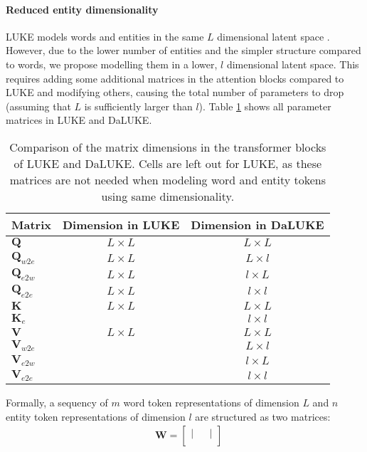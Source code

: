 \documentclass[10pt, a4paper]{article}
\begin{document}
{\paragraph{Reduced entity dimensionality}
LUKE models words and entities in the same $ L $ dimensional latent space \cite{yamada2020luke}.
However, due to the lower number of entities and the simpler structure compared to words, we propose modelling them in a lower, $ l $ dimensional latent space.
This requires adding some additional matrices in the attention blocks compared to LUKE and modifying others, causing the total number of parameters to drop (assuming that $ L $ is sufficiently larger than $ l $).
Table \ref{tab:mats} shows all parameter matrices in LUKE and DaLUKE.
\begin{table}[H]
    \centering
    \footnotesize
    \begin{tabular}{l|c|c}
        Matrix&Dimension in LUKE&Dimension in DaLUKE\\\hline
        $ \mathbf Q $&$ L\times L $&$ L\times L $\\
        $ \mathbf Q_{w2e} $&$ L\times L $&$ L\times l $\\
        $ \mathbf Q_{e2w} $&$ L\times L $&$ l\times L $\\
        $ \mathbf Q_{e2e} $&$ L\times L $&$ l\times l $\\
        $ \mathbf K $&$ L\times L $&$ L\times L $\\
        $ \mathbf K_e $&&$ l\times l $\\
        $ \mathbf V $&$ L\times L $&$ L\times L $\\
        $ \mathbf V_{w2e} $&&$ L\times l $\\
        $ \mathbf V_{e2w} $&&$ l\times L $\\
        $ \mathbf V_{e2e} $&&$ l\times l $\\
    \end{tabular}
    \caption{Comparison of the matrix dimensions in the transformer blocks of LUKE and DaLUKE. Cells are left out for LUKE, as these matrices are not needed when modeling word and entity tokens using same dimensionality.}
    \label{tab:mats}
\end{table}\noindent
Formally, a sequency of $ m $ word token representations of dimension $ L $ and $ n $ entity token representations of dimension $ l $ are structured as two matrices:
\begin{align*}
    &\mathbf W = \begin{bmatrix}
        |&&|\\

\end{bmatrix}
\end{align*}}
\end{document}
